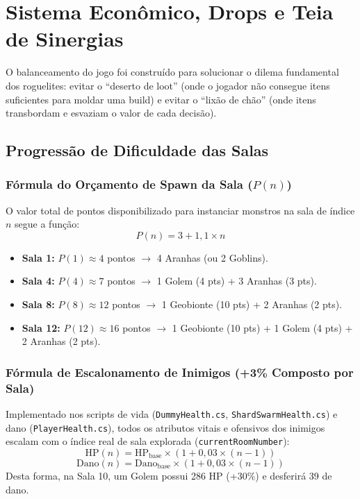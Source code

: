 \documentclass[a4paper,12pt]{report}
\begin{document}
\chapter{Sistema Econômico, Drops e Teia de Sinergias}\label{cap:economia}

O balanceamento do jogo foi construído para solucionar o dilema fundamental dos roguelites: evitar o ``deserto de loot'' (onde o jogador não consegue itens suficientes para moldar uma build) e evitar o ``lixão de chão'' (onde itens transbordam e esvaziam o valor de cada decisão).

\section{Progressão de Dificuldade das Salas}

\subsection{Fórmula do Orçamento de Spawn da Sala ($P(n)$)}
O valor total de pontos disponibilizado para instanciar monstros na sala de índice $n$ segue a função:
\[
P(n) = 3 + 1{,}1 \times n
\]
\begin{itemize}
    \item \textbf{Sala 1:} $P(1) \approx 4$ pontos $\rightarrow$ 4 Aranhas (ou 2 Goblins).
    \item \textbf{Sala 4:} $P(4) \approx 7$ pontos $\rightarrow$ 1 Golem (4 pts) + 3 Aranhas (3 pts).
    \item \textbf{Sala 8:} $P(8) \approx 12$ pontos $\rightarrow$ 1 Geobionte (10 pts) + 2 Aranhas (2 pts).
    \item \textbf{Sala 12:} $P(12) \approx 16$ pontos $\rightarrow$ 1 Geobionte (10 pts) + 1 Golem (4 pts) + 2 Aranhas (2 pts).
\end{itemize}

\subsection{Fórmula de Escalonamento de Inimigos (+3\% Composto por Sala)}
Implementado nos scripts de vida (\texttt{DummyHealth.cs}, \texttt{ShardSwarmHealth.cs}) e dano (\texttt{PlayerHealth.cs}), todos os atributos vitais e ofensivos dos inimigos escalam com o índice real de sala explorada (\texttt{currentRoomNumber}):
\[
\text{HP}(n) = \text{HP}_{\text{base}} \times (1 + 0{,}03 \times (n - 1))
\]
\[
\text{Dano}(n) = \text{Dano}_{\text{base}} \times (1 + 0{,}03 \times (n - 1))
\]
Desta forma, na Sala 10, um Golem possui 286 HP (+30\%) e desferirá 39 de dano.
\end{document}
